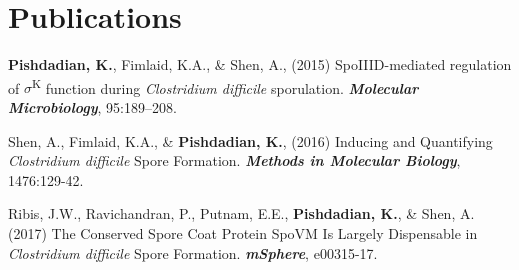 \documentclass[letterpaper,hidelinks]{scrartcl}
\begin{document}
%
%

\section*{Publications}

\begin{list1}
\item \textbf{Pishdadian, K.}, Fimlaid, K.A., \& Shen, A., (2015) SpoIIID-mediated regulation of $\sigma$\textsuperscript{K} function during \emph{Clostridium difficile} sporulation. \textbf{\emph{Molecular Microbiology}}, 95:189--208.
\item Shen, A., Fimlaid, K.A., \& \textbf{Pishdadian, K.}, (2016) Inducing and Quantifying \emph{Clostridium difficile} Spore Formation. \textbf{\emph{Methods in Molecular Biology}}, 1476:129-42.
\item Ribis, J.W., Ravichandran, P., Putnam, E.E., \textbf{Pishdadian, K.}, \& Shen, A. (2017) The Conserved Spore Coat Protein SpoVM Is Largely Dispensable in \emph{Clostridium difficile} Spore Formation. \textbf{\emph{mSphere}}, e00315-17.
\end{list1}

%
%
\end{document}
